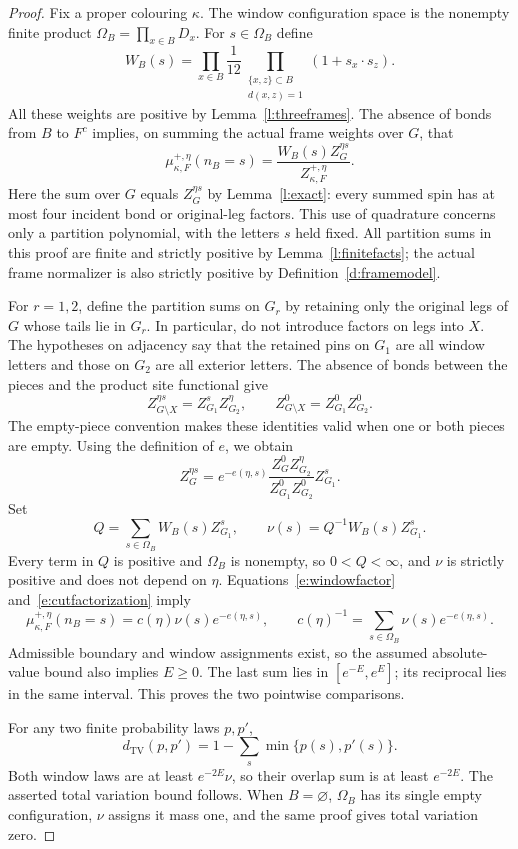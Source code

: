 \begin{proof}
Fix a proper colouring \(\kappa\).  The window configuration space
is the nonempty finite product \(\Omega_B=\prod_{x\in B}D_x\).
For \(s\in\Omega_B\) define
\[
 W_B(s)=\prod_{x\in B}\frac1{12}
       \prod_{\substack{\{x,z\}\subset B\\d(x,z)=1}}
                       (1+s_x\cdot s_z).
\]
All these weights are positive by Lemma~\ref{l:threeframes}.
The absence of bonds from \(B\) to \(F^c\) implies, on summing
the actual frame weights over \(G\), that
\begin{equation}\label{e:windowfactor}
 \mu^{+,\eta}_{\kappa,F}(n_B=s)
       =\frac{W_B(s)Z_G^{\eta s}}
                    {Z^{+,\eta}_{\kappa,F}}.
\end{equation}
Here the sum over \(G\) equals \(Z_G^{\eta s}\) by
Lemma~\ref{l:exact}: every summed spin has at most four incident
bond or original-leg factors.  This use of quadrature concerns
only a partition polynomial, with the letters \(s\) held fixed.
All partition sums in this proof are finite and strictly positive
by Lemma~\ref{l:finitefacts}; the actual frame normalizer is also
strictly positive by Definition~\ref{d:framemodel}.

For \(r=1,2\), define the partition sums on \(G_r\) by retaining
only the original legs of \(G\) whose tails lie in \(G_r\).
In particular, do not introduce factors on legs into \(X\).
The hypotheses on adjacency say that the retained pins on \(G_1\)
are all window letters and those on \(G_2\) are all exterior
letters.  The absence of bonds between the pieces and the product
site functional give
\begin{equation}\label{e:cutfactorization}
 Z_{G\setminus X}^{\eta s}=Z_{G_1}^{s}Z_{G_2}^{\eta},
 \qquad
 Z_{G\setminus X}^{0}=Z_{G_1}^{0}Z_{G_2}^{0}.
\end{equation}
The empty-piece convention makes these identities valid when
one or both pieces are empty.  Using the definition of \(e\),
we obtain
\[
 Z_G^{\eta s}
   =e^{-e(\eta,s)}
       \frac{Z_G^0 Z_{G_2}^{\eta}}{Z_{G_1}^0Z_{G_2}^0}
       Z_{G_1}^{s}.
\]
Set
\[
 Q=\sum_{s\in\Omega_B}W_B(s)Z_{G_1}^{s},\qquad
 \nu(s)=Q^{-1}W_B(s)Z_{G_1}^{s}.
\]
Every term in \(Q\) is positive and \(\Omega_B\) is nonempty,
so \(0<Q<\infty\), and \(\nu\) is strictly positive and does
not depend on \(\eta\).  Equations~\eqref{e:windowfactor}
and~\eqref{e:cutfactorization} imply
\[
 \mu^{+,\eta}_{\kappa,F}(n_B=s)
       =c(\eta)\nu(s)e^{-e(\eta,s)},\qquad
 c(\eta)^{-1}=\sum_{s\in\Omega_B}\nu(s)e^{-e(\eta,s)}.
\]
Admissible boundary and window assignments exist, so the assumed
absolute-value bound also implies \(E\ge0\).  The last sum lies
in \([e^{-E},e^E]\); its reciprocal lies in the same interval.
This proves the two pointwise comparisons.

For any two finite probability laws \(p,p'\),
\[
 d_{\mathrm{TV}}(p,p')
    =1-\sum_s\min\{p(s),p'(s)\}.
\]
Both window laws are at least \(e^{-2E}\nu\), so their overlap
sum is at least \(e^{-2E}\).  The asserted total variation bound
follows.  When \(B=\varnothing\), \(\Omega_B\) has its single
empty configuration, \(\nu\) assigns it mass one, and the same
proof gives total variation zero.
\end{proof}

